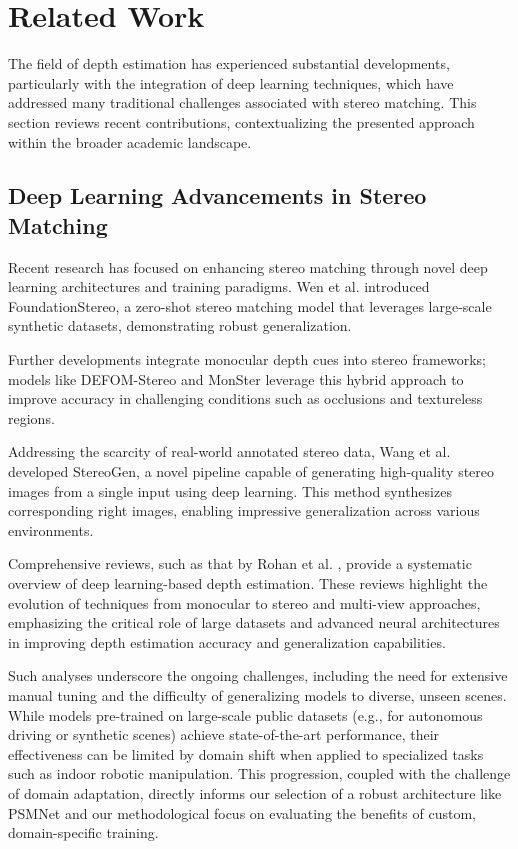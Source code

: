 \documentclass[conference]{IEEEtran}
\begin{document}
\section{Related Work}
The field of depth estimation has experienced substantial developments, particularly with the integration of deep learning techniques, which have addressed many traditional challenges associated with stereo matching. This section reviews recent contributions, contextualizing the presented approach within the broader academic landscape.

\subsection{Deep Learning Advancements in Stereo Matching}
Recent research has focused on enhancing stereo matching through novel deep learning architectures and training paradigms. Wen et al. \cite{wen2025foundationstereo} introduced FoundationStereo, a zero-shot stereo matching model that leverages large-scale synthetic datasets, demonstrating robust generalization.

Further developments integrate monocular depth cues into stereo frameworks; models like DEFOM-Stereo \cite{jiang2025defom} and MonSter \cite{cheng2025monster} leverage this hybrid approach to improve accuracy in challenging conditions such as occlusions and textureless regions.

Addressing the scarcity of real-world annotated stereo data, Wang et al. \cite{wang2025stereogen} developed StereoGen, a novel pipeline capable of generating high-quality stereo images from a single input using deep learning. This method synthesizes corresponding right images, enabling impressive generalization across various environments.

Comprehensive reviews, such as that by Rohan et al. \cite{rohan2025systematic}, provide a systematic overview of deep learning-based depth estimation. These reviews highlight the evolution of techniques from monocular to stereo and multi-view approaches, emphasizing the critical role of large datasets and advanced neural architectures in improving depth estimation accuracy and generalization capabilities. 

Such analyses underscore the ongoing challenges, including the need for extensive manual tuning and the difficulty of generalizing models to diverse, unseen scenes. While models pre-trained on large-scale public datasets (e.g., for autonomous driving or synthetic scenes) achieve state-of-the-art performance, their effectiveness can be limited by domain shift when applied to specialized tasks such as indoor robotic manipulation. This progression, coupled with the challenge of domain adaptation, directly informs our selection of a robust architecture like PSMNet and our methodological focus on evaluating the benefits of custom, domain-specific training.
\end{document}
